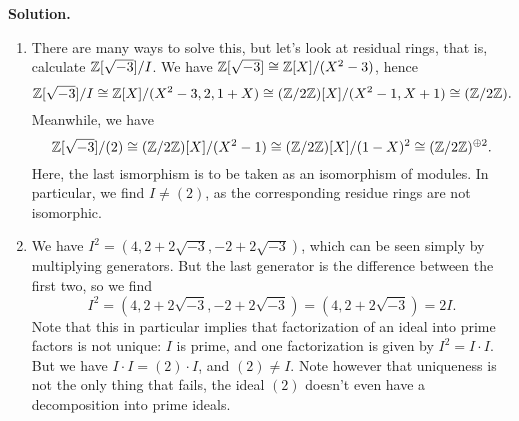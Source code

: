 \documentclass[a4paper,11pt]{article}
\begin{document}
\textbf{Solution.}
\begin{enumerate}[labelindent=0pt, wide]
    \item There are many ways to solve this, but let's look at residual rings, 
        that is, calculate $\mathbb{Z}[\sqrt{-3}]/I$. We have $\mathbb{Z}[\sqrt{-3}] \cong
        \mathbb{Z}[X]/(X^2 - 3)$, hence $$\mathbb{Z}[\sqrt{-3}]/I \cong 
        \mathbb{Z}[X]/(X^2 - 3, 2, 1+X) \cong (\mathbb{Z}/2\mathbb{Z})[X]/(X^2-1, X+1) \cong 
        (\mathbb{Z}/2\mathbb{Z}).$$
        Meanwhile, we have 
        \begin{equation*}
            \mathbb{Z}[\sqrt{-3}]/(2) \cong (\mathbb{Z}/2\mathbb{Z})[X]/(X^2 - 1) \cong 
            (\mathbb{Z}/2\mathbb{Z})[X]/(1-X)^2 \cong (\mathbb{Z}/2\mathbb{Z})^{\oplus 2}.
        \end{equation*}
        Here, the last ismorphism is to be taken as an isomorphism of modules. 
        In particular, we find $I \neq (2)$, as the corresponding residue rings
        are not isomorphic. 
    \item We have $I^2 = (4, 2 + 2 \sqrt{-3}, -2 + 2 \sqrt{-3})$, which
        can be seen simply by multiplying generators. But the last 
        generator is the difference between the first two, so we find 
        \begin{equation*}
            I^2 = (4, 2 + 2 \sqrt{-3}, -2 + 2 \sqrt{-3})
            =( 4, 2 + 2 \sqrt{-3}) = 2I.
        \end{equation*}
        Note that this in particular implies that factorization of an ideal
        into prime factors is not unique: $I$ is prime, and 
        one factorization is given by $I^2 = I\cdot I$. But we have
        $I\cdot I = (2)\cdot I$, and $(2) \neq I$. Note however that 
        uniqueness is not the only thing that fails, the ideal $(2)$
        doesn't even have a decomposition into prime ideals. 
\end{enumerate}


\contactend
\end{document}
